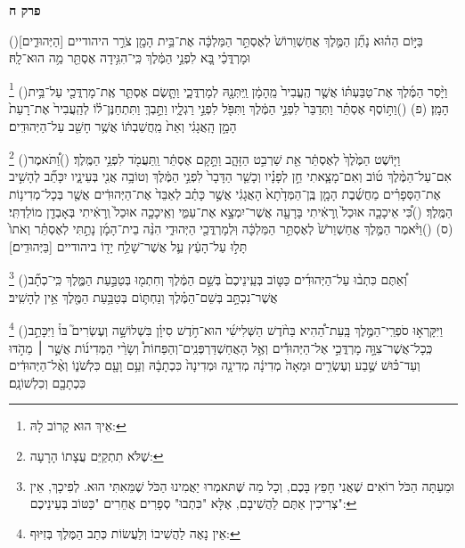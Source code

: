 \documentclass[12pt, openany]{book}
\newcommand{\chapname}{}
\newcommand{\newchap}[1]{
	\addcontentsline{toc}{chapter}{#1}
	\renewcommand{\chapname}{#1}
		\begin{center}
			\textbf{%
\fontsize{16pt}{16pt}\selectfont
				#1}
		\end{center}
}
\newcommand{\footnotecomment}[1]{
	\renewcommand\thefootnote{}
	\footnote{\textsf{#1}}}
\newcommand{\commenta}[1]{\footnotecomment{#1}\hspace{0em}}
\newcommand{\vsnum}[1]{(\hebrewnumeral{#1})\space}
\begin{document}
\newchap{פרק ח}
\begin{multicols}{2}
\vsnum{1}בַּיּ֣וֹם הַה֗וּא נָתַ֞ן הַמֶּ֤לֶךְ אֲחַשְׁוֵרוֹשׁ֙ לְאֶסְתֵּ֣ר הַמַּלְכָּ֔ה אֶת־בֵּ֥ית הָמָ֖ן צֹרֵ֣ר היהודיים [הַיְּהוּדִ֑ים] וּמָרְדֳּכַ֗י בָּ֚א לִפְנֵ֣י הַמֶּ֔לֶךְ כִּֽי־הִגִּ֥ידָה אֶסְתֵּ֖ר מַ֥ה הוּא־לָֽהּ׃%
\commenta{ אֵיךְ הוּא קָרוֹב לָהּ:}%
\vsnum{2}וַיָּ֨סַר הַמֶּ֜לֶךְ אֶת־טַבַּעְתּ֗וֹ אֲשֶׁ֤ר הֶֽעֱבִיר֙ מֵֽהָמָ֔ן וַֽיִּתְּנָ֖הּ לְמָרְדֳּכָ֑י וַתָּ֧שֶׂם אֶסְתֵּ֛ר אֶֽת־מָרְדֳּכַ֖י עַל־בֵּ֥ית הָמָֽן׃ (פ)
\vsnum{3}וַתּ֣וֹסֶף אֶסְתֵּ֗ר וַתְּדַבֵּר֙ לִפְנֵ֣י הַמֶּ֔לֶךְ וַתִּפֹּ֖ל לִפְנֵ֣י רַגְלָ֑יו וַתֵּ֣בְךְּ וַתִּתְחַנֶּן־ל֗וֹ לְהַֽעֲבִיר֙ אֶת־רָעַת֙ הָמָ֣ן הָֽאֲגָגִ֔י וְאֵת֙ מַֽחֲשַׁבְתּ֔וֹ אֲשֶׁ֥ר חָשַׁ֖ב עַל־הַיְּהוּדִֽים׃%
\commenta{ שֶׁלֹּא תִתְקַיֵּם עֲצָתוֹ הָרָעָה:}%
\vsnum{4}וַיּ֤וֹשֶׁט הַמֶּ֙לֶךְ֙ לְאֶסְתֵּ֔ר אֵ֖ת שַׁרְבִ֣ט הַזָּהָ֑ב וַתָּ֣קָם אֶסְתֵּ֔ר וַֽתַּעֲמֹ֖ד לִפְנֵ֥י הַמֶּֽלֶךְ׃
\vsnum{5}וַ֠תֹּאמֶר אִם־עַל־הַמֶּ֨לֶךְ ט֜וֹב וְאִם־מָצָ֧אתִי חֵ֣ן לְפָנָ֗יו וְכָשֵׁ֤ר הַדָּבָר֙ לִפְנֵ֣י הַמֶּ֔לֶךְ וְטוֹבָ֥ה אֲנִ֖י בְּעֵינָ֑יו יִכָּתֵ֞ב לְהָשִׁ֣יב אֶת־הַסְּפָרִ֗ים מַחֲשֶׁ֜בֶת הָמָ֤ן בֶּֽן־הַמְּדָ֙תָא֙ הָאֲגָגִ֔י אֲשֶׁ֣ר כָּתַ֗ב לְאַבֵּד֙ אֶת־הַיְּהוּדִ֔ים אֲשֶׁ֖ר בְּכָל־מְדִינ֥וֹת הַמֶּֽלֶךְ׃
\vsnum{6}כִּ֠י אֵיכָכָ֤ה אוּכַל֙ וְֽרָאִ֔יתִי בָּרָעָ֖ה אֲשֶׁר־יִמְצָ֣א אֶת־עַמִּ֑י וְאֵֽיכָכָ֤ה אוּכַל֙ וְֽרָאִ֔יתִי בְּאָבְדַ֖ן מוֹלַדְתִּֽי׃ (ס)
\vsnum{7}וַיֹּ֨אמֶר הַמֶּ֤לֶךְ אֲחַשְׁוֵרֹשׁ֙ לְאֶסְתֵּ֣ר הַמַּלְכָּ֔ה וּֽלְמָרְדֳּכַ֖י הַיְּהוּדִ֑י הִנֵּ֨ה בֵית־הָמָ֜ן נָתַ֣תִּי לְאֶסְתֵּ֗ר וְאֹתוֹ֙ תָּל֣וּ עַל־הָעֵ֔ץ עַ֛ל אֲשֶׁר־שָׁלַ֥ח יָד֖וֹ ביהודיים [בַּיְּהוּדִֽים׃]%
\commenta{ וּמֵעַתָּה הַכֹּל רוֹאִים שֶׁאֲנִי חָפֵץ בָּכֶם, וְכָל מַה שֶּׁתּאמְרוּ יַאֲמִינוּ הַכֹּל שֶׁמֵּאִתִּי הוּא. לְפִיכָךְ, אֵין צְרִיכִין אַתֶּם לַהֲשִׁיבָם, אֶלָּא "כִּתְבוּ" סְפָרִים אֲחֵרִים "כַּטּוֹב בְּעֵינֵיכֶם": }%
\vsnum{8}וְ֠אַתֶּם כִּתְב֨וּ עַל־הַיְּהוּדִ֜ים כַּטּ֤וֹב בְּעֵֽינֵיכֶם֙ בְּשֵׁ֣ם הַמֶּ֔לֶךְ וְחִתְמ֖וּ בְּטַבַּ֣עַת הַמֶּ֑לֶךְ כִּֽי־כְתָ֞ב אֲשֶׁר־נִכְתָּ֣ב בְּשֵׁם־הַמֶּ֗לֶךְ וְנַחְתּ֛וֹם בְּטַבַּ֥עַת הַמֶּ֖לֶךְ אֵ֥ין לְהָשִֽׁיב׃%
\commenta{ אֵין נָאֶה לַהֲשִׁיבוֹ וְלַעֲשׂוֹת כְּתַב הַמֶּלֶךְ בְּזִיּוּף:}%
\vsnum{9}וַיִּקָּרְא֣וּ סֹפְרֵֽי־הַמֶּ֣לֶךְ בָּֽעֵת־הַ֠הִיא בַּחֹ֨דֶשׁ הַשְּׁלִישִׁ֜י הוּא־חֹ֣דֶשׁ סִיוָ֗ן בִּשְׁלוֹשָׁ֣ה וְעֶשְׂרִים֮ בּוֹ֒ וַיִּכָּתֵ֣ב כְּֽכָל־אֲשֶׁר־צִוָּ֣ה מָרְדֳּכַ֣י אֶל־הַיְּהוּדִ֡ים וְאֶ֣ל הָאֲחַשְׁדַּרְפְּנִֽים־וְהַפַּחוֹת֩ וְשָׂרֵ֨י הַמְּדִינ֜וֹת אֲשֶׁ֣ר ׀ מֵהֹ֣דּוּ וְעַד־כּ֗וּשׁ שֶׁ֣בַע וְעֶשְׂרִ֤ים וּמֵאָה֙ מְדִינָ֔ה מְדִינָ֤ה וּמְדִינָה֙ כִּכְתָבָ֔הּ וְעַ֥ם וָעָ֖ם כִּלְשֹׁנ֑וֹ וְאֶ֨ל־הַיְּהוּדִ֔ים כִּכְתָבָ֖ם וְכִלְשׁוֹנָֽם׃%

\end{multicols}
\end{document}
